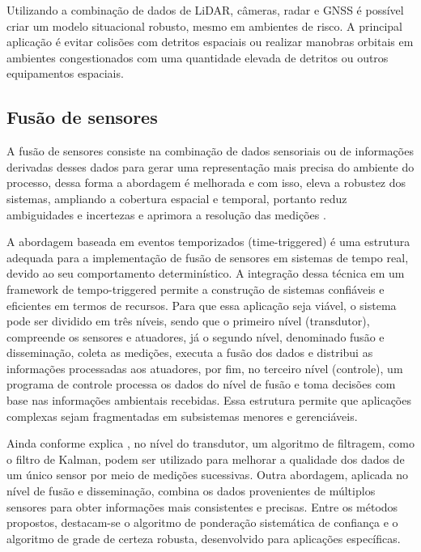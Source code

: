 Utilizando a combinação de dados de LiDAR, câmeras, radar e GNSS é possível criar um modelo situacional robusto, mesmo em ambientes de risco. A principal aplicação é evitar colisões com detritos espaciais ou realizar manobras orbitais em ambientes congestionados com uma quantidade elevada de detritos ou outros equipamentos espaciais.

\subsection{Fusão de sensores}

A fusão de sensores consiste na combinação de dados sensoriais ou de informações derivadas desses dados para gerar uma representação mais precisa do ambiente do processo, dessa forma a abordagem é melhorada e com isso, eleva a robustez dos sistemas, ampliando a cobertura espacial e temporal, portanto reduz ambiguidades e incertezas e aprimora a resolução das medições \citep{elmenreichDissertation}.

A abordagem baseada em eventos temporizados (time-triggered) é uma estrutura adequada para a implementação de fusão de sensores em sistemas de tempo real, devido ao seu comportamento determinístico. A integração dessa técnica em um framework de tempo-triggered permite a construção de sistemas confiáveis e eficientes em termos de recursos. Para que essa aplicação seja viável, o sistema pode ser dividido em três níveis, sendo que o primeiro nível (transdutor), compreende os sensores e atuadores, já o segundo nível, denominado fusão e disseminação, coleta as medições, executa a fusão dos dados e distribui as informações processadas aos atuadores, por fim, no terceiro nível (controle), um programa de controle processa os dados do nível de fusão e toma decisões com base nas informações ambientais recebidas. Essa estrutura permite que aplicações complexas sejam fragmentadas em subsistemas menores e gerenciáveis.

Ainda conforme explica \citep{elmenreichDissertation}, no nível do transdutor, um algoritmo de filtragem, como o filtro de Kalman, podem ser utilizado para melhorar a qualidade dos dados de um único sensor por meio de medições sucessivas. Outra abordagem, aplicada no nível de fusão e disseminação, combina os dados provenientes de múltiplos sensores para obter informações mais consistentes e precisas. Entre os métodos propostos, destacam-se o algoritmo de ponderação sistemática de confiança e o algoritmo de grade de certeza robusta, desenvolvido para aplicações específicas.

